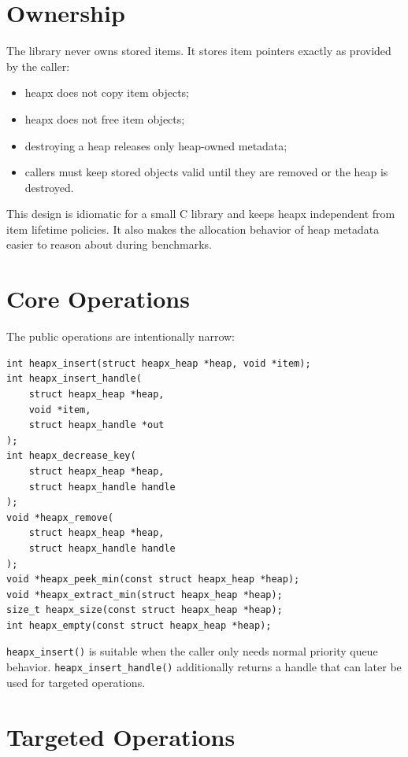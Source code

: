 \section{Ownership}

The library never owns stored items.
It stores item pointers exactly as provided by the caller:

\begin{itemize}
    \item heapx does not copy item objects;
    \item heapx does not free item objects;
    \item destroying a heap releases only heap-owned metadata;
    \item callers must keep stored objects valid until they are removed or the heap is destroyed.
\end{itemize}

This design is idiomatic for a small C library and keeps heapx independent from item lifetime policies.
It also makes the allocation behavior of heap metadata easier to reason about during benchmarks.

\section{Core Operations}

The public operations are intentionally narrow:

\begin{lstlisting}[style=cstyle, caption={Core heap operations.}]
int heapx_insert(struct heapx_heap *heap, void *item);
int heapx_insert_handle(
    struct heapx_heap *heap,
    void *item,
    struct heapx_handle *out
);
int heapx_decrease_key(
    struct heapx_heap *heap,
    struct heapx_handle handle
);
void *heapx_remove(
    struct heapx_heap *heap,
    struct heapx_handle handle
);
void *heapx_peek_min(const struct heapx_heap *heap);
void *heapx_extract_min(struct heapx_heap *heap);
size_t heapx_size(const struct heapx_heap *heap);
int heapx_empty(const struct heapx_heap *heap);
\end{lstlisting}

\texttt{heapx\_insert()} is suitable when the caller only needs normal priority queue behavior.
\texttt{heapx\_insert\_handle()} additionally returns a handle that can later be used for targeted operations.

\section{Targeted Operations}

